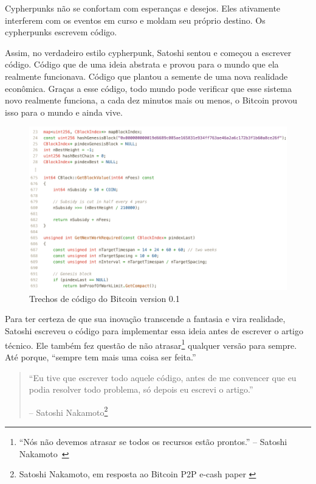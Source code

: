 Cypherpunks não se confortam com esperanças e desejos. 
Eles ativamente interferem com os eventos em curso e moldam seu próprio destino. 
Os cypherpunks escrevem código.

Assim, no verdadeiro estilo cypherpunk, Satoshi sentou e começou a escrever código. 
Código que de uma ideia abstrata e provou para o mundo que ela realmente funcionava. 
Código que plantou a semente de uma nova realidade econômica.
Graças a esse código, todo mundo pode verificar que esse sistema novo realmente funciona, 
a cada dez minutos mais ou menos, o Bitcoin provou isso para o mundo e ainda vive.

\begin{figure}
  \includegraphics{assets/images/bitcoin-code-white.png}
  \caption{Trechos de código do Bitcoin version 0.1}
  \label{fig:bitcoin-code-white}
\end{figure}

Para ter certeza de que sua inovação transcende a fantasia e vira realidade, Satoshi 
escreveu o código para implementar essa ideia antes de escrever o artigo técnico. 
Ele também fez questão de não atrasar\footnote{\enquote{Nós não devemos atrasar 
		se todos os recursos estão prontos.} 
	-- Satoshi Nakamoto~\cite{satoshi-delay}} qualquer versão para sempre.
	Até porque, \enquote{sempre tem mais uma coisa ser feita.}

\begin{quotation}\begin{samepage}
\enquote{Eu tive que escrever todo aquele código, antes de me convencer que eu podia resolver todo problema, só depois eu escrevi o artigo.}
\begin{flushright} -- Satoshi Nakamoto\footnote{Satoshi Nakamoto, em resposta ao Bitcoin P2P e-cash paper \cite{satoshi-mail-code-first}}
\end{flushright}\end{samepage}\end{quotation}

